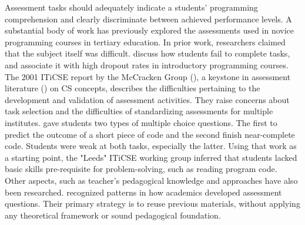 Assessment tasks should adequately indicate a students’ programming comprehension and clearly discriminate between achieved performance levels.
A substantial body of work has previously explored the assessments used in novice programming courses in tertiary education. In prior work, researchers claimed that the subject itself was difficult.  discuss how students fail to complete tasks, and  associate it with high dropout rates in introductory programming courses. The 2001 ITiCSE report by the McCracken Group (\cite{McCracken2001}), a keystone in assessment literature (\cite{Giordano2015}) on CS concepts, describes the difficulties pertaining to the development and validation of assessment activities. They raise concerns about task selection and the difficulties of standardizing assessments for multiple institutes.   gave students two types of multiple choice questions. The first to predict the outcome of a short piece of code and the second finish near-complete code. Students were weak at both tasks, especially the latter. Using that work as a starting point, the "Leeds" ITiCSE working group inferred that students lacked basic skills pre-requisite for problem-solving, such as reading program code. Other aspects, such as teacher's pedagogical knowledge and approaches have also been researched.  recognized patterns in how academics developed assessment questions. Their primary strategy is to reuse previous materials, without applying any theoretical framework or sound pedagogical foundation.


